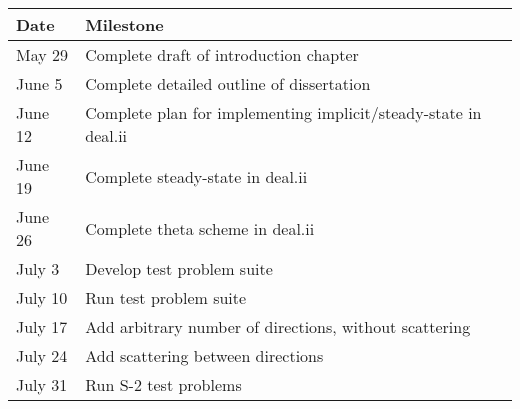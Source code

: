 \documentclass{report}
\begin{document}
\begin{tabular}{l l}\hline
  \textbf{Date} & \textbf{Milestone}\\\hline
  May 29        & Complete draft of introduction chapter\\
  June 5        & Complete detailed outline of dissertation\\
  June 12       & Complete plan for implementing implicit/steady-state in deal.ii\\
  June 19       & Complete steady-state in deal.ii\\
  June 26       & Complete theta scheme in deal.ii\\
  July 3        & Develop test problem suite\\
  July 10       & Run test problem suite\\
  July 17       & Add arbitrary number of directions, without scattering\\
  July 24       & Add scattering between directions\\
  July 31       & Run S-2 test problems\\\hline
\end{tabular}
\end{document}

